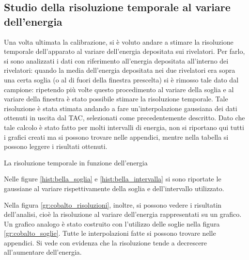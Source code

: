 \subsection{Studio della risoluzione temporale al variare dell'energia}

Una volta ultimata la calibrazione, si è voluto andare a stimare la risoluzione temporale dell'apparato al variare dell'energia depositata sui
rivelatori. Per farlo, si sono analizzati i dati con riferimento all'energia depositata all'interno dei rivelatori: quando la media dell'energia
depositata nei due rivelatori era sopra una certa soglia (o al di fuori della finestra prescelta) si è rimosso tale dato dal campione: ripetendo più
volte questo procedimento al variare della soglia e al variare della finestra è stato possibile stimare la risoluzione temporale. Tale
risoluzione è stata stimata andando a fare un'interpolazione gaussiana dei dati ottenuti in uscita dal TAC, selezionati come precedentemente descritto.
Dato che tale calcolo è stato fatto per molti intervalli di energia, non si riportano qui tutti i grafici creati ma si possono trovare nelle appendici,
mentre nella tabella si possono leggere i risultati ottenuti.\\

%
\begin{table}
	\centering
	
	\caption{La risoluzione temporale in funzione dell'energia}
	\label{tab:01tab1}
\end{table}
%
Nelle figure \ref{hist:bella_soglia} e \ref{hist:bella_intervalla} si sono riportate le gaussiane al variare rispettivamente della soglia e dell'intervallo utilizzato.


Nella figura \ref{gr:cobalto_risoluzioni}, inoltre, si possono vedere i risultatin dell'analisi, cioè la risoluzione al variare dell'energia rappresentati su un grafico.
Un grafico analogo è stato costruito con l'utilizzo delle soglie nella figura \ref{gr:cobalto_soglie}. Tutte le interpolazioni fatte si possono trovare nelle appendici. Si
vede con evidenza che la risoluzione tende a decrescere all'aumentare dell'energia.
\\
\\


